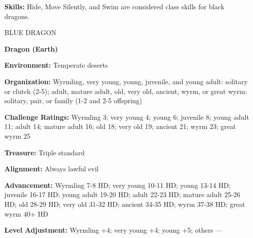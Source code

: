 \documentclass{article}
\begin{document}
\textbf{Skills:} Hide, Move Silently, and Swim are considered class skills for 
black dragons.

\vspace{12pt}
BLUE DRAGON

\textbf{Dragon (Earth)}

\textbf{Environment:} Temperate deserts

\textbf{Organization:} Wyrmling, very young, young, juvenile, and young adult: 
solitary or clutch (2-5); adult, mature adult, old, very old, ancient, wyrm, or 
great wyrm: solitary, pair, or family (1-2 and 2-5 offspring)

\textbf{Challenge Ratings:} Wyrmling 3; very young 4; young 6; juvenile 8; young 
adult 11; adult 14; mature adult 16; old 18; very old 19; ancient 21; wyrm 23; 
great wyrm 25

\textbf{Treasure:} Triple standard

\textbf{Alignment:} Always lawful evil

\textbf{Advancement:} Wyrmling 7-8 HD; very young 10-11 HD; young 13-14 HD; juvenile 
16-17 HD; young adult 19-20 HD; adult 22-23 HD; mature adult 25-26 HD; old 28-29 
HD; very old 31-32 HD; ancient 34-35 HD; wyrm 37-38 HD; great wyrm 40+ HD

\textbf{Level Adjustment:} Wyrmling +4; very young +4; young +5; others ---
\end{document}

